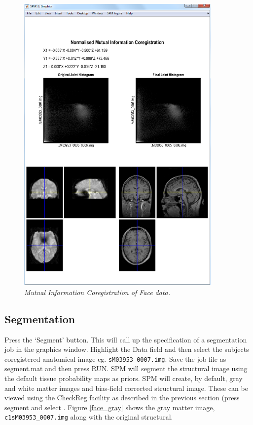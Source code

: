 \begin{figure}
\begin{center}
\includegraphics[width=100mm]{faces/coreg}
\caption{\em Mutual Information Coregistration of Face data. \label{face_coreg}}
\end{center}
\end{figure}

\subsection{Segmentation}

Press the `Segment' button. This will call up the specification of a segmentation job in the graphics window. Highlight the Data field and then select the subjects coregistered anatomical image eg. \verb!sM03953_0007.img!. Save the job file as {\sf segment.mat} and then press RUN. SPM will segment the structural image using the default tissue probability maps as priors. SPM will create, by default, gray and white matter images and bias-field corrected structural image. These can be viewed using the CheckReg facility as described in the previous section (press segment and select . Figure \ref{face_gray} shows the gray matter image, \verb!c1sM03953_0007.img! along with the original structural.

